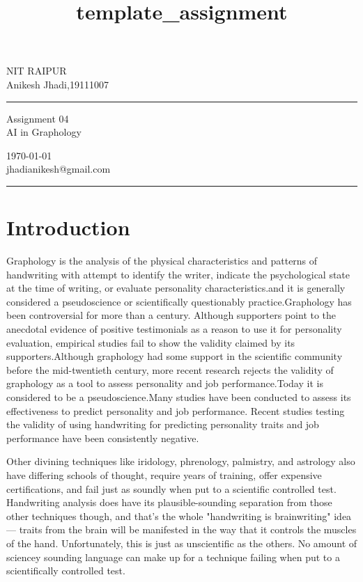\documentclass[a4paper,10pt]{article}
\begin{document}
\title{template_assignment} 
\fancyhead[C]{}
\begin{minipage}{0.295\textwidth} 
\raggedright
NIT RAIPUR\\ 
\footnotesize 
Anikesh Jhadi,19111007 
\medskip\hrule
\end{minipage}
\begin{minipage}{0.4\textwidth} 
\centering 
\large 
Assignment 04\\ 
\normalsize 
AI in Graphology\\ 
\end{minipage}
\begin{minipage}{0.295\textwidth} 
\raggedleft
\today\\ 
\footnotesize 
jhadianikesh@gmail.com
\medskip\hrule
\end{minipage}
\section{Introduction}
Graphology is the analysis of the physical characteristics and patterns of handwriting with attempt to identify the writer, indicate the psychological state at the time of writing, or evaluate personality characteristics.and it is generally considered a pseudoscience or scientifically questionably practice.Graphology has been controversial for more than a century. Although supporters point to the anecdotal evidence of positive testimonials as a reason to use it for personality evaluation, empirical studies fail to show the validity claimed by its supporters.Although graphology had some support in the scientific community before the mid-twentieth century, more recent research rejects the validity of graphology as a tool to assess personality and job performance.Today it is considered to be a pseudoscience.Many studies have been conducted to assess its effectiveness to predict personality and job performance. Recent studies testing the validity of using handwriting for predicting personality traits and job performance have been consistently negative.

Other divining techniques like iridology, phrenology, palmistry, and astrology also have differing schools of thought, require years of training, offer expensive certifications, and fail just as soundly when put to a scientific controlled test. Handwriting analysis does have its plausible-sounding separation from those other techniques though, and that's the whole "handwriting is brainwriting" idea — traits from the brain will be manifested in the way that it controls the muscles of the hand. Unfortunately, this is just as unscientific as the others. No amount of sciencey sounding language can make up for a technique failing when put to a scientifically controlled test.
\end{document}
